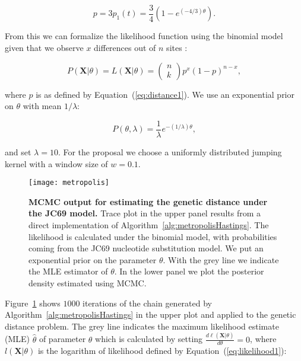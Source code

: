 \begin{equation}
p=3p_{1}\left(t\right)=\frac{3}{4}\left(1-e^{\left(-4/3\right)\theta}\right).
\label{eq:distance1}
\end{equation}

\noindent
From this we can formalize the likelihood function using the binomial model given that we observe $x$ differences out of $n$ sites :

\begin{equation}
P\left(\mathbf{X}|\theta\right)=L\left(\mathbf{X}|\theta\right)=\left(\begin{array}{c}
n\\
k
\end{array}\right)p^{x}(1-p)^{n-x},
\label{eq:likelihood1}
\end{equation}

\noindent
where $p$ is as defined by Equation~(\ref{eq:distance1}).
We use an exponential prior on $\theta$ with mean $1/\lambda$:

\begin{equation}
P\left(\theta,\lambda\right)=\frac{1}{\lambda}e^{-(1/\lambda)\theta},
\label{eq:expPrior}
\end{equation}

\noindent
and set $\lambda=10$.
For the proposal we choose a uniformly distributed jumping kernel with a window size of $w=0.1$.

\begin{figure}[h!]
\centering
\texttt{[image: metropolis]} 
\caption{
{ \footnotesize 
{\bf MCMC output for estimating the genetic distance under the JC69 model.}
Trace plot in the upper panel results from a direct implementation of Algorithm~\ref{alg:metropolisHastings}.
The likelihood is calculated under the binomial model, with probabilities coming from the JC69 nucleotide substitution model. 
We put an exponential prior on the parameter $\theta$.
With the grey line we indicate the MLE estimator of $\theta$. 
In the lower panel we plot the posterior density estimated using MCMC.
}%
}
\label{fig:metropolis}
\end{figure}

Figure~\ref{fig:metropolis} shows $1000$ iterations of the chain generated by Algorithm~\ref{alg:metropolisHastings} in the upper plot and applied to the genetic distance problem.
The grey line indicates the maximum likelihood estimate (MLE) $\hat{\theta}$ of parameter $\theta$ which is calculated by setting $\frac{d\ell\left(\mathbf{X}|\theta\right)}{d\theta}=0$, where $l\left(\mathbf{X}|\theta\right)$ is the logarithm of likelihood defined by Equation~(\ref{eq:likelihood1}):

